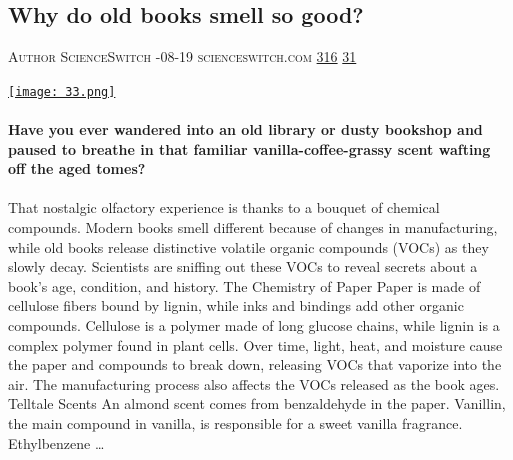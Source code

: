\documentclass[10pt,a4paper]{article}
\begin{document}
\begin{multicols}{2}
\raggedcolumns
\noindent\begin{minipage}{\linewidth}
\medskip
\subsection{Why do old books smell so good?}
\textsc{\footnotesize
{\scriptsize\faUser}\space 
Author ScienceSwitch 
{\scriptsize\faCalendar}-08-19 
{\scriptsize\faGlobe}\space 
scienceswitch.com 
{\scriptsize\faThumbsOUp}\space 
\href{http://news.ycombinator.com/item?id=37188015\&utm\_term=comment}{316} 
{\scriptsize\faComments}\space 
\href{http://news.ycombinator.com/item?id=37188015\&utm\_term=comment}{31} 
}
\par\medskip\noindent
\href{https://scienceswitch.com/2023/08/19/why-do-old-books-smell-so-good/?utm\_source=hackernewsletter\&utm\_medium=email\&utm\_term=books}{
    \texttt{[image: 33.png]}
}
\end{minipage}
\paragraph{}
\textbf{Have you ever wandered into an old library or dusty bookshop and paused to breathe in that familiar vanilla-coffee-grassy scent wafting off the aged tomes?}
\paragraph{}
 That nostalgic olfactory experience is thanks to a bouquet of chemical compounds.
Modern books smell different because of changes in manufacturing, while old books release distinctive volatile organic compounds (VOCs) as they slowly decay. Scientists are sniffing out these VOCs to reveal secrets about a book’s age, condition, and history.
The Chemistry of Paper
Paper is made of cellulose fibers bound by lignin, while inks and bindings add other organic compounds. Cellulose is a polymer made of long glucose chains, while lignin is a complex polymer found in plant cells.
Over time, light, heat, and moisture cause the paper and compounds to break down, releasing VOCs that vaporize into the air. The manufacturing process also affects the VOCs released as the book ages.
Telltale Scents
An almond scent comes from benzaldehyde in the paper. Vanillin, the main compound in vanilla, is responsible for a sweet vanilla fragrance. Ethylbenzene
\dots\par
\noindent\begin{minipage}{\linewidth}
\medskip

\end{minipage}
\end{multicols}
\end{document}
